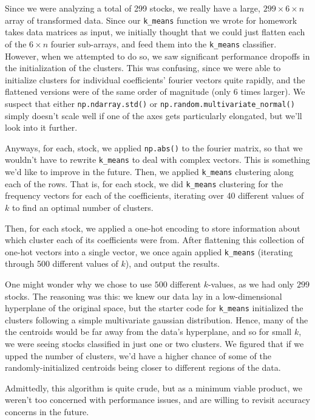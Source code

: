 \documentclass[final]{article}
\begin{document}
Since we were analyzing a total of 299 stocks, we really have a large,
$299 \times 6 \times n$ array of transformed data. Since our
\texttt{k\_means} function we wrote for homework takes data matrices
as input, we initially thought that we could just flatten each of the
$6 \times n $ fourier sub-arrays, and feed them into the
\texttt{k\_means} classifier. However, when we attempted to do so, we
saw significant performance dropoffs in the initialization of the
clusters. This was confusing, since we were able to initialize
clusters for individual coefficients' fourier vectors quite rapidly,
and the flattened versions were of the same order of magnitude (only 6
times larger). We suspect that either \texttt{np.ndarray.std()} or
\texttt{np.random.multivariate\_normal()} simply doesn't scale well if
one of the axes gets particularly elongated, but we'll look into it
further.

Anyways, for each, stock, we applied \texttt{np.abs()} to the fourier
matrix, so that we wouldn't have to rewrite \texttt{k\_means} to deal
with complex vectors. This is something we'd like to improve in the
future. Then, we applied \texttt{k\_means} clustering along each of
the rows. That is, for each stock, we did \texttt{k\_means} clustering
for the frequency vectors for each of the coefficients, iterating over
40 different values of $k$ to find an optimal number of clusters.

Then, for each stock, we applied a one-hot encoding to store
information about which cluster each of its coefficients were from.
After flattening this collection of one-hot vectors into a single
vector, we once again applied \texttt{k\_means} (iterating through 500
different values of $k$), and output the results.

One might wonder why we chose to use $500$ different $k$-values, as
we had only $299$ stocks. The reasoning was this: we knew our data lay
in a low-dimensional hyperplane of the original space, but the starter
code for \texttt{k\_means} initialized the clusters following a simple
multivariate gaussian distribution. Hence, many of the the centroids
would be far away from the data's hyperplane, and so for small $k$, we
were seeing stocks classified in just one or two clusters. We figured
that if we upped the number of clusters, we'd have a higher chance of
some of the randomly-initialized centroids being closer to different
regions of the data.

Admittedly, this algorithm is quite crude, but as a minimum viable
product, we weren't too concerned with performance issues, and are
willing to revisit accuracy concerns in the future.
\end{document}
